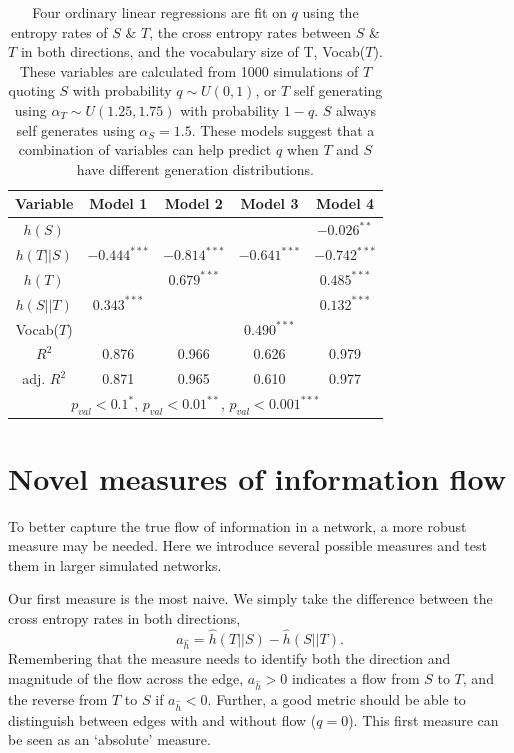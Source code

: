 \begin{table}[!htbp]
\centering 
\begin{tabular}{c|cccc}
Variable& Model 1& Model 2& Model 3& Model 4\\ \hline
$h(S)$& & & & $-0.026^{**}$\\
$h(T||S)$& $-0.444^{***}$& $-0.814^{***}$& $-0.641^{***}$& $-0.742^{***}$\\
$h(T)$& & $0.679^{***}$& & $0.485^{***}$\\
$h(S||T)$& $0.343^{***}$& & & $0.132^{***}$\\
Vocab($T$)& & & $0.490^{***}$& \\\hline
\rule{0pt}{3ex}$R^2$& 0.876& 0.966& 0.626& 0.979\\ \hline
\rule{0pt}{3ex}adj. $R^2$& 0.871& 0.965& 0.610& 0.977\\ \hline
\multicolumn{5}{c}{$p_{val}<0.1^*$, $p_{val}<0.01^{**}$, $p_{val}<0.001^{***}$} \\ \hline\end{tabular}
\caption{Four ordinary linear regressions are fit on $q$ using the entropy rates of $S$ \& $T$, the cross entropy rates between $S$ \& $T$ in both directions, and the vocabulary size of T, Vocab($T$). These variables are calculated from 1000 simulations of $T$ quoting $S$ with probability $q\sim U(0,1)$, or $T$ self generating using $\alpha_T\sim U(1.25, 1.75)$ with probability $1-q$. $S$ always self generates using $\alpha_S = 1.5$. These models suggest that a combination of variables can help predict $q$ when $T$ and $S$ have different generation distributions.} \label{tab:quoter_mutlipleOLS}
\end{table}


\section{Novel measures of information flow}

To better capture the true flow of information in a network, a more robust measure may be needed. Here we introduce several possible measures and test them in larger simulated networks.

Our first measure is the most naive. We simply take the difference between the cross entropy rates in both directions, 
\begin{equation}a_{\hat{h}}  = \hat{h}(T||S) - \hat{h}(S||T).\end{equation}
Remembering that the measure needs to identify both the direction and magnitude of the flow across the edge, $a_{\hat{h}} >0$ indicates a flow from $S$ to $T$, and the reverse from $T$ to $S$ if $a_{\hat{h}} <0$. Further, a good metric should be able to distinguish between edges with and without flow ($q=0$). This first measure can be seen as an `absolute' measure.

